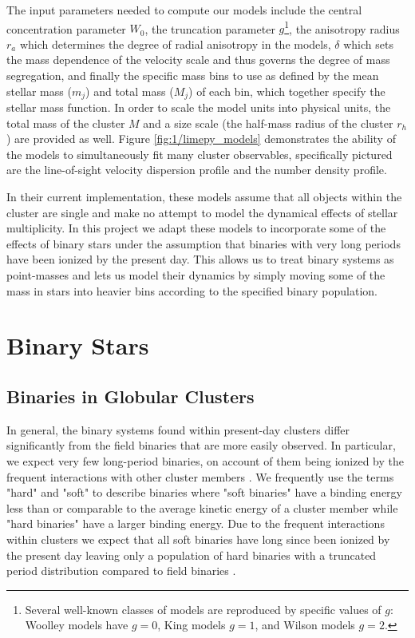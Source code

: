 The input parameters needed to compute our models include the central concentration parameter $W_0$,
the truncation parameter $g$\footnote{Several well-known classes of models are reproduced by
	specific values of $g$: Woolley models \citep{Woolley1954} have $g=0$, King models \citep{King1966}
	$g=1$, and Wilson models \citep{Wilson1975} $g=2$.}, the anisotropy radius $r_a$ which determines
the degree of radial anisotropy in the models, $\delta$ which sets the mass dependence of the
velocity scale and thus governs the degree of mass segregation, and finally the specific mass bins
to use as defined by the mean stellar mass ($m_j$) and total mass ($M_j$) of each bin, which
together specify the stellar mass function. In order to scale the model units into physical units,
the total mass of the cluster $M$ and a size scale (the half-mass radius of the cluster $r_h$) are
provided as well. Figure \ref{fig:1/limepy_models} demonstrates the ability of the models to
simultaneously fit many cluster observables, specifically pictured are the line-of-sight velocity
dispersion profile and the number density profile.


In their current implementation, these models assume that all objects within the cluster are single
and make no attempt to model the dynamical effects of stellar multiplicity. In this project we adapt
these models to incorporate some of the effects of binary stars under the assumption that binaries
with very long periods have been ionized by the present day. This allows us to treat binary systems
as point-masses and lets us model their dynamics by simply moving some of the mass in stars into
heavier bins according to the specified binary population.



\section{Binary Stars}
\subsection{Binaries in Globular Clusters}


In general, the binary systems found within present-day clusters differ significantly from the field
binaries that are more easily observed. In particular, we expect very few long-period binaries, on
account of them being ionized by the frequent interactions with other cluster members
\citep{Heggie2003}. We frequently use the terms "hard" and "soft" to describe binaries where "soft
binaries" have a binding energy less than or comparable to the average kinetic energy of a cluster
member while "hard binaries" have a larger binding energy. Due to the frequent interactions within
clusters we expect that all soft binaries have long since been ionized by the present day leaving
only a population of hard binaries with a truncated period distribution compared to field binaries
\citep{Heggie2003}.




